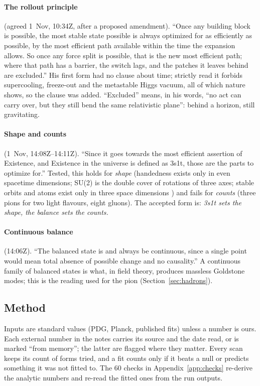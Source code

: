 \documentclass[11pt,a4paper]{article}
\begin{document}
\paragraph{The rollout principle} (agreed 1~Nov, 10:34Z, after a proposed amendment). ``Once any building block is possible, the most
stable state possible is always optimized for as efficiently as possible, by the most efficient path available within the time the
expansion allows. So once any force split is possible, that is the new most efficient path; where that path has a barrier, the switch lags,
and the patches it leaves behind are excluded.'' His first form had no clause about time; strictly read it forbids supercooling, freeze-out
and the metastable Higgs vacuum, all of which nature shows, so the clause was added. ``Excluded'' means, in his words, ``no act can carry
over, but they still bend the same relativistic plane'': behind a horizon, still gravitating.

\paragraph{Shape and counts} (1~Nov, 14:08Z--14:11Z). ``Since it goes towards the most efficient assertion of Existence, and Existence in
the universe is defined as 3s1t, those are the parts to optimize for.'' Tested, this holds for \emph{shape} (handedness exists only in even
spacetime dimensions; SU(2) is the double cover of rotations of three axes; stable orbits and atoms exist only in three space dimensions
\cite{ehrenfest,tegmark}) and fails for \emph{counts} (three pions for two light flavours, eight gluons). The accepted form is: \emph{3s1t sets
the shape, the balance sets the counts.}

\paragraph{Continuous balance} (14:06Z). ``The balanced state is and always be continuous, since a single point would mean total absence of
possible change and no causality.'' A continuous family of balanced states is what, in field theory, produces massless Goldstone modes;
this is the reading used for the pion (Section~\ref{sec:hadrons}).

\subsection{Method}
Inputs are standard values (PDG, Planck, published fits) unless a number is ours. Each external number in the notes carries its source
and the date read, or is marked ``from memory''; the latter are flagged where they matter. Every scan keeps its count of forms tried, and a
fit counts only if it beats a null or predicts something it was not fitted to. The 60 checks in Appendix~\ref{app:checks} re-derive the
analytic numbers and re-read the fitted ones from the run outputs.
\end{document}
